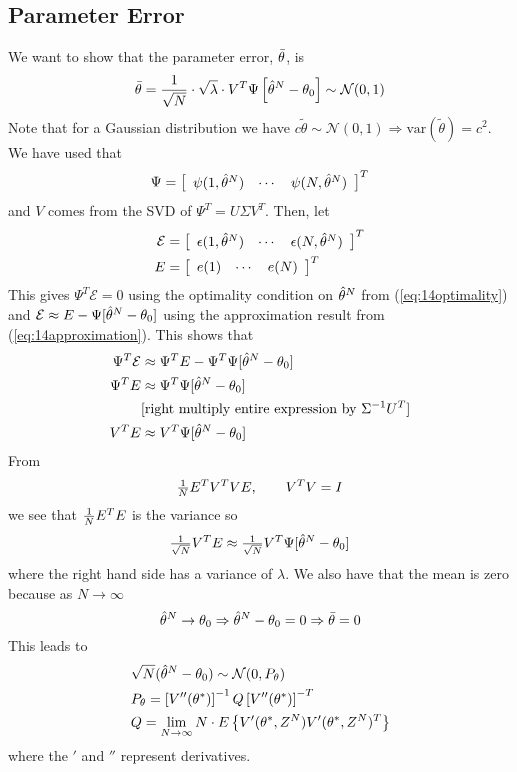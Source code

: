 \subsection{Parameter Error}
We want to show that the parameter error, $\bar{\theta}$, is
$$\bar{\theta} = \frac{1}{\sqrt{N}}\cdot\sqrt{\lambda}\cdot V^T\Psi\left[\hat{\theta}^N-\theta_0\right] \sim \mathcal{N}(0,1)$$
Note that for a Gaussian distribution we have $c\tilde{\theta}\sim\mathcal{N}(0,1)\Rightarrow \text{var}(\tilde{\theta})=c^2$. We have used that
$$\Psi = \left[\begin{array}{c c c} \psi(1,\hat{\theta}^N) & \cdots & \psi(N,\hat{\theta}^N) \end{array}\right]^T$$
and $V$ comes from the SVD of $\Psi^T=U\Sigma V^T$. Then, let
\begin{align*}
\mathcal{E} &= \left[\begin{array}{c c c} \epsilon(1,\hat{\theta}^N) & \cdots & \epsilon(N,\hat{\theta}^N) \end{array}\right]^T \\
E &= \left[\begin{array}{c c c} e(1) & \cdots & e(N) \end{array}\right]^T
\end{align*}
This gives $\Psi^T\mathcal{E} = 0$ using the optimality condition on $\hat{\theta}^N$ from (\ref{eq:14optimality}) and $\mathcal{E} \approx E-\Psi[\hat{\theta}^N-\theta_0]$ using the approximation result from (\ref{eq:14approximation}). This shows that
\begin{align*}
\Psi^T\mathcal{E} &\approx \Psi^TE-\Psi^T\Psi[\hat{\theta}^N-\theta_0] \\
\Psi^TE &\approx \Psi^T\Psi[\hat{\theta}^N-\theta_0] \\
&[\text{right multiply entire expression by } \Sigma^{-1}U^T] \\
V^TE &\approx V^T\Psi[\hat{\theta}^N-\theta_0]
\end{align*}
From
$$\tfrac{1}{N} E^TV^TVE, \qquad V^TV=I$$
we see that $\frac{1}{N} E^TE$ is the variance so
$$\tfrac{1}{\sqrt{N}}V^TE \approx \tfrac{1}{\sqrt{N}}V^T\Psi[\hat{\theta}^N-\theta_0]$$
where the right hand side has a variance of $\lambda$. We also have that the mean is zero because as $N\to\infty$
$$\hat{\theta}^N\to\theta_0 \Rightarrow \hat{\theta}^N-\theta_0 = 0 \Rightarrow \bar{\theta} = 0$$
This leads to
\begin{align}
\begin{split}
&\sqrt{N}(\hat{\theta}^N-\theta_0) \sim \mathcal{N}(0,P_\theta) \\
&P_\theta = \left[V''(\theta^\ast)\right]^{-1}Q\left[V''(\theta^\ast)\right]^{-T} \\
&Q = \lim_{N\to\infty}N\cdot E\left\lbrace V'(\theta^\ast,Z^N)V'(\theta^\ast,Z^N)^T \right\rbrace
\end{split}
\end{align}
where the $'$ and $''$ represent derivatives.

